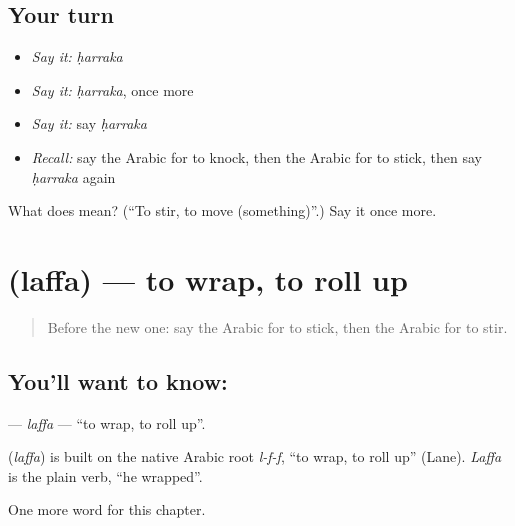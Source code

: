 \subsection*{Your turn}
\begin{itemize}
\raggedright
  \item \emph{Say it:} \emph{ḥarraka}
  \item \emph{Say it:} \emph{ḥarraka}, once more
  \item \emph{Say it:} say \emph{ḥarraka}
  \item \emph{Recall:} say the Arabic for to knock, then the Arabic for to stick, then say \emph{ḥarraka} again
\end{itemize}

\begin{tcolorbox}[breakable,colback=teal!4,colframe=teal!35!black,title={Before you move on}]
What does  mean? (\textquotedblleft{}To stir, to move (something)\textquotedblright{}.) Say it once more.
\end{tcolorbox}
\section[\texorpdfstring{\ar{لف} (laffa)}{لف (laffa)}]{ (laffa) — to wrap, to roll up}

\label{lesson:AR-C260-laffa}



\begin{quote}
Before the new one: say the Arabic for to stick, then the Arabic for to stir.
\end{quote}

\subsection*{You'll want to know: }
\textbf{} — \emph{laffa} — \textquotedblleft{}to wrap, to roll up\textquotedblright{}.

\begin{cousinweb}
\textbf{} (\emph{laffa}) is built on the native Arabic root \emph{l-f-f}, \textquotedblleft{}to wrap, to roll up\textquotedblright{} (Lane). \emph{Laffa} is the plain verb, \textquotedblleft{}he wrapped\textquotedblright{}.
\end{cousinweb}

\begin{grammarlens}[title={What you've built}]
One more word for this chapter.
\end{grammarlens}

